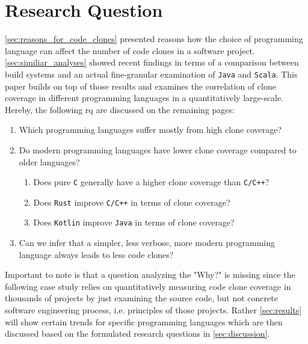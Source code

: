 
\section{Research Question}
\label{sec:research_question}

\autoref{sec:reasons_for_code_clones} presented reasons how the choice of programming language can affect the number of code clones in a software project. \autoref{sec:similiar_analyses} showed recent findings in terms of a comparison between build systems and an actual fine-granular examination of \texttt{Java} and \texttt{Scala}.
This paper builds on top of those results and examines the correlation of clone coverage in different programming languages in a quantitatively large-scale. Hereby, the following \ac{rq} are discussed on the remaining pages:

\begin{enumerate}
	\item Which programming languages suffer mostly from high clone coverage?
	\item Do modern programming languages have lower clone coverage compared to older languages?
	\begin{enumerate}
		\item Does pure \texttt{C} generally have a higher clone coverage than \texttt{C/C++}?
		\item Does \texttt{Rust} improve \texttt{C/C++} in terms of clone coverage?
		\item Does \texttt{Kotlin} improve \texttt{Java} in terms of clone coverage?
	\end{enumerate}
	\item Can we infer that a simpler, less verbose, more modern programming language always leads to less code clones?
\end{enumerate}

Important to note is that a question analyzing the "Why?" is missing since the following case study relies on quantitatively measuring code clone coverage in thousands of projects by just examining the source code, but not concrete software engineering process, i.e. principles of those projects. Rather \autoref{sec:results} will show certain trends for specific programming languages which are then discussed based on the formulated research questions in \autoref{sec:discussion}.